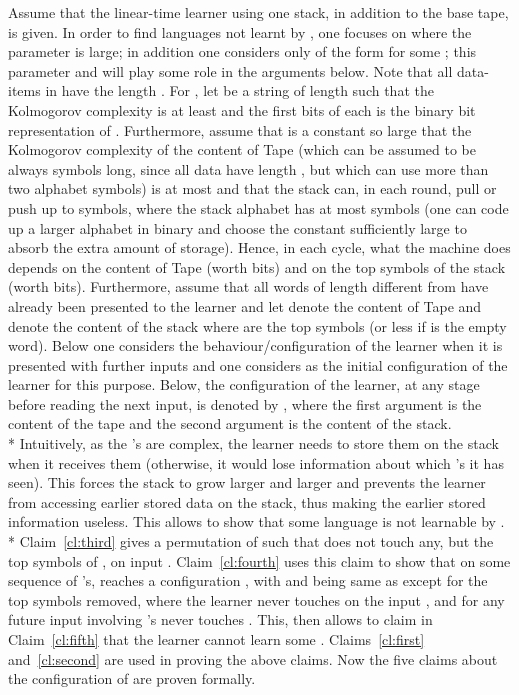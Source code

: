 \documentclass{LMCS}
\theoremstyle{plain}\newtheorem{athm}[thm]{Theorem}
\theoremstyle{plain}\newtheorem{aprop}[thm]{Proposition}
\theoremstyle{plain}\newtheorem{aprob}[thm]{Open Problem}
\theoremstyle{plain}\newtheorem{acor}[thm]{Corollary}
\theoremstyle{plain}\newtheorem{alem}[thm]{Lemma}
\theoremstyle{definition}\newtheorem{adefn}[thm]{Definition}
\theoremstyle{definition}\newtheorem{arem}[thm]{Remark}
\theoremstyle{plain}\newtheorem{aexmp}[thm]{Example}
\theoremstyle{plain}\newtheorem{aclm}[thm]{Claim}
\def\sp{\\*\indent}
\begin{document}
\proof
Assume that the linear-time learner  using one stack, 
in addition to the base tape,
is given.  In order to find languages not
learnt by , one focuses on  where the parameter  is
large; in addition one considers only  of the form  for some ;
this parameter  and  will play some role in the arguments below.
Note that all data-items in  have the length .
For , let  be a
string of length  such that the Kolmogorov
complexity  is at least  and the first  bits
of each  is the binary bit representation of . Furthermore,
assume that  is a constant so large that the Kolmogorov complexity
of the content of Tape  (which can be assumed to be always 
symbols long, since
all data have length , but which can use more than two alphabet symbols)
is at most  and that the stack can, in each round, pull or push
up to  symbols, where the stack alphabet has at most  symbols
(one can code up a larger alphabet in binary and choose the constant
 sufficiently large to absorb the extra amount of storage).
Hence, in each cycle, what the machine does depends on the content of
Tape  (worth  bits) and on the top  symbols of the stack
(worth  bits). Furthermore, assume that all words of length 
different from  have already been presented to the learner
and let  denote the content of Tape  and  denote the content
of the stack where  are the top  symbols (or less if  is the
empty word). Below one considers the behaviour/configuration of the learner
when it is presented with further inputs and one considers 
as the initial configuration of the learner for this purpose.
Below, the configuration of the learner, at any stage before reading the
next input, is denoted by , where the first argument
is the content of the tape and the second argument is the content
of the stack.
\sp
Intuitively, as the 's are complex, the learner needs to store
them on the stack when it receives them (otherwise, it would lose
information about which 's it has seen). This forces the stack
to grow larger and larger and prevents the learner from accessing
earlier stored data on the stack, thus making the earlier stored
information useless. This allows to show that some language 
is not learnable by .
\sp
Claim~\ref{cl:third} gives a permutation 
 of  such that
 does not touch any, but the top  symbols of , on
input . Claim~\ref{cl:fourth} uses
this claim to show that on some sequence  of 's,  reaches a
configuration , with  and
 being same as  except for the top  symbols removed,
where the learner never touches  on the input 
, and for any future input involving 's never
touches . This, then allows to claim in Claim~\ref{cl:fifth}
that the learner cannot learn some . 
Claims~\ref{cl:first} and~\ref{cl:second} are used in proving the above
claims.
Now the five claims about the configuration of  are proven formally.
\end{document}
